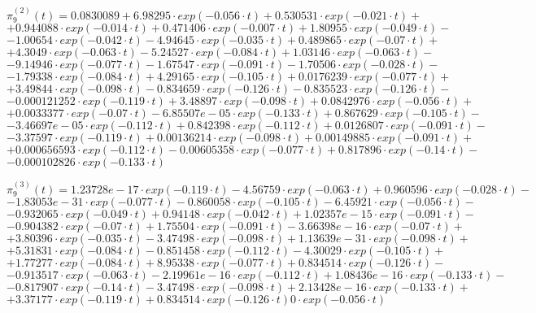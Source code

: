  $\pi^{(2)}_9(t)=0.0830089+6.98295\cdot exp(-0.056\cdot t)+0.530531\cdot exp(-0.021\cdot t)+$
$+0.944088\cdot exp(-0.014\cdot t)+0.471406\cdot exp(-0.007\cdot t)+1.80955\cdot exp(-0.049\cdot t)-$
$-1.00654\cdot exp(-0.042\cdot t)-4.94645\cdot exp(-0.035\cdot t)+0.489865\cdot exp(-0.07\cdot t)+$
$+4.3049\cdot exp(-0.063\cdot t)-5.24527\cdot exp(-0.084\cdot t)+1.03146\cdot exp(-0.063\cdot t)-$
$-9.14946\cdot exp(-0.077\cdot t)-1.67547\cdot exp(-0.091\cdot t)-1.70506\cdot exp(-0.028\cdot t)-$
$-1.79338\cdot exp(-0.084\cdot t)+4.29165\cdot exp(-0.105\cdot t)+0.0176239\cdot exp(-0.077\cdot t)+$
$+3.49844\cdot exp(-0.098\cdot t)-0.834659\cdot exp(-0.126\cdot t)-0.835523\cdot exp(-0.126\cdot t)-$
$-0.000121252\cdot exp(-0.119\cdot t)+3.48897\cdot exp(-0.098\cdot t)+0.0842976\cdot exp(-0.056\cdot t)+$
$+0.0033377\cdot exp(-0.07\cdot t)-6.85507e-05\cdot exp(-0.133\cdot t)+0.867629\cdot exp(-0.105\cdot t)-$
$-3.46697e-05\cdot exp(-0.112\cdot t)+0.842398\cdot exp(-0.112\cdot t)+0.0126807\cdot exp(-0.091\cdot t)-$
$-3.37597\cdot exp(-0.119\cdot t)+0.00136214\cdot exp(-0.098\cdot t)+0.00149885\cdot exp(-0.091\cdot t)+$
$+0.000656593\cdot exp(-0.112\cdot t)-0.00605358\cdot exp(-0.077\cdot t)+0.817896\cdot exp(-0.14\cdot t)-$
$-0.000102826\cdot exp(-0.133\cdot t)$

 $\pi^{(3)}_9(t)=1.23728e-17\cdot exp(-0.119\cdot t)-4.56759\cdot exp(-0.063\cdot t)+0.960596\cdot exp(-0.028\cdot t)-$
$-1.83053e-31\cdot exp(-0.077\cdot t)-0.860058\cdot exp(-0.105\cdot t)-6.45921\cdot exp(-0.056\cdot t)-$
$-0.932065\cdot exp(-0.049\cdot t)+0.94148\cdot exp(-0.042\cdot t)+1.02357e-15\cdot exp(-0.091\cdot t)-$
$-0.904382\cdot exp(-0.07\cdot t)+1.75504\cdot exp(-0.091\cdot t)-3.66398e-16\cdot exp(-0.07\cdot t)+$
$+3.80396\cdot exp(-0.035\cdot t)-3.47498\cdot exp(-0.098\cdot t)+1.13639e-31\cdot exp(-0.098\cdot t)+$
$+5.31831\cdot exp(-0.084\cdot t)-0.851458\cdot exp(-0.112\cdot t)-4.30029\cdot exp(-0.105\cdot t)+$
$+1.77277\cdot exp(-0.084\cdot t)+8.95338\cdot exp(-0.077\cdot t)+0.834514\cdot exp(-0.126\cdot t)-$
$-0.913517\cdot exp(-0.063\cdot t)-2.19961e-16\cdot exp(-0.112\cdot t)+1.08436e-16\cdot exp(-0.133\cdot t)-$
$-0.817907\cdot exp(-0.14\cdot t)-3.47498\cdot exp(-0.098\cdot t)+2.13428e-16\cdot exp(-0.133\cdot t)+$
$+3.37177\cdot exp(-0.119\cdot t)+0.834514\cdot exp(-0.126\cdot t)0\cdot exp(-0.056\cdot t)$